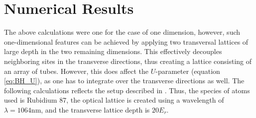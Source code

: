 \chapter{Numerical Results}

The above calculations were one for the case of one dimension, however, such one-dimensional features can be achieved by applying two transversal lattices of large depth in the two remaining dimensions. This effectively decouples neighboring sites in the transverse directions, thus creating a lattice consisting of an array of tubes. However, this does affect the $U$-parameter (equation \ref{eq:BH_U}), as one has to integrate over the transverse directions as well.
The following calculations reflects the setup described in \cite{FrankBloch}.  Thus, the species of atoms used is Rubidium 87, the optical lattice is created using a wavelength of $\lambda = 1064 \mathrm{nm}$, and the transverse lattice depth is $20 E_r$.

